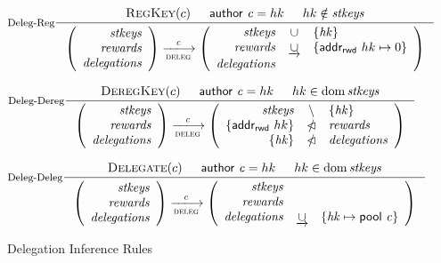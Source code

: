 \documentclass[11pt,a4paper]{article}
\DeclareMathOperator{\dom}{dom}
\newcommand{\restrictdom}{\lhd}
\newcommand{\subtractdom}{\mathbin{\slashed{\restrictdom}}}
\newcommand{\union}{\cup}
\newcommand{\unionoverride}{\mathbin{\underrightarrow\cup}}
\newcommand{\var}[1]{\mathit{#1}}
\newcommand{\fun}[1]{\mathsf{#1}}
\newcommand{\trans}[2]{\xlongrightarrow[\textsc{#1}]{#2}}
\newcommand{\RegKey}[1]{\textsc{RegKey}(#1)}
\newcommand{\DeregKey}[1]{\textsc{DeregKey}(#1)}
\newcommand{\Delegate}[1]{\textsc{Delegate}(#1)}
\newcommand{\cauthor}[1]{\fun{author}~ \var{#1}}
\newcommand{\pool}[1]{\fun{pool}~ \var{#1}}
\newcommand{\addr}[1]{\fun{addr_{rwd}}~ \var{#1}}
\begin{document}
\begin{figure}
  \centering
  \begin{equation}\label{eq:deleg-reg}
    \inference[Deleg-Reg]
    {
      \RegKey{c} & \cauthor{c} = hk & hk \notin \var{stkeys}
    }
    {
      \left(
      \begin{array}{r}
        \var{stkeys} \\
        \var{rewards} \\
        \var{delegations}
      \end{array}
      \right)
      \trans{deleg}{\var{c}}
      \left(
      \begin{array}{rcl}
        \var{stkeys} & \union & \{\var{hk}\}\\
        \var{rewards} & \unionoverride & \{\addr \var{hk} \mapsto 0\}\\
        \var{delegations}
      \end{array}
      \right)
    }
  \end{equation}

  \begin{equation}\label{eq:deleg-dereg}
    \inference[Deleg-Dereg]
    {
      \DeregKey{c} & \cauthor{c} = hk & hk \in \dom \var{stkeys}
    }
    {
      \left(
      \begin{array}{r}
        \var{stkeys} \\
        \var{rewards} \\
        \var{delegations}
      \end{array}
      \right)
      \trans{deleg}{\var{c}}
      \left(
      \begin{array}{rcl}
        \var{stkeys} & \setminus & \{\var{hk}\}\\
        \{\addr \var{hk}\} & \subtractdom & \var{rewards} \\
        \{\var{hk}\} & \subtractdom & \var{delegations}
      \end{array}
      \right)
    }
  \end{equation}

  \begin{equation}\label{eq:deleg-deleg}
    \inference[Deleg-Deleg]
    {
      \Delegate{c} & \cauthor{c} = hk & hk \in \dom \var{stkeys}
    }
    {
      \left(
      \begin{array}{r}
        \var{stkeys} \\
        \var{rewards} \\
        \var{delegations}
      \end{array}
      \right)
      \trans{deleg}{c}
      \left(
      \begin{array}{rcl}
        \var{stkeys} \\
        \var{rewards} \\
        \var{delegations} & \unionoverride & \{\var{hk} \mapsto \pool c\}
      \end{array}
      \right)
    }
  \end{equation}
  \caption{Delegation Inference Rules}
  \label{fig:delegation-rules}
\end{figure}
\end{document}
